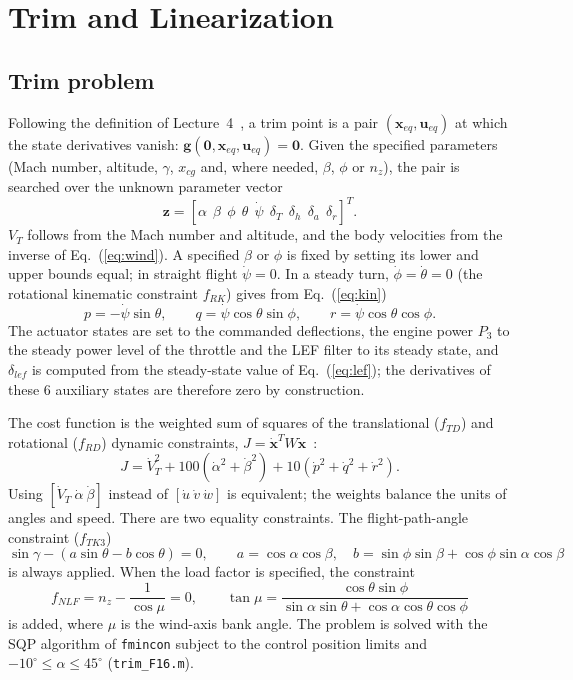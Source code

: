 \documentclass[conf]{new-aiaa}
\begin{document}
\section{Trim and Linearization}

\subsection{Trim problem}
Following the definition of Lecture~4~\cite{lec4}, a trim point is a pair $(\mathbf x_{eq},\mathbf u_{eq})$ at which the state derivatives vanish: $\mathbf g(\mathbf 0,\mathbf x_{eq},\mathbf u_{eq})=\mathbf 0$. Given the specified parameters (Mach number, altitude, $\gamma$, $x_{cg}$ and, where needed, $\beta$, $\phi$ or $n_z$), the pair is searched over the unknown parameter vector
\begin{equation}
\mathbf z=[\alpha\ \ \beta\ \ \phi\ \ \theta\ \ \dot\psi\ \ \delta_T\ \ \delta_h\ \ \delta_a\ \ \delta_r]^T.
\end{equation}
$V_T$ follows from the Mach number and altitude, and the body velocities from the inverse of Eq.~(\ref{eq:wind}). A specified $\beta$ or $\phi$ is fixed by setting its lower and upper bounds equal; in straight flight $\dot\psi=0$. In a steady turn, $\dot\phi=\dot\theta=0$ (the rotational kinematic constraint $f_{RK}$) gives from Eq.~(\ref{eq:kin})
\begin{equation}
p=-\dot\psi\sin\theta,\qquad q=\dot\psi\cos\theta\sin\phi,\qquad r=\dot\psi\cos\theta\cos\phi.
\end{equation}
The actuator states are set to the commanded deflections, the engine power $P_3$ to the steady power level of the throttle and the LEF filter to its steady state, and $\delta_{lef}$ is computed from the steady-state value of Eq.~(\ref{eq:lef}); the derivatives of these 6 auxiliary states are therefore zero by construction.

The cost function is the weighted sum of squares of the translational ($f_{TD}$) and rotational ($f_{RD}$) dynamic constraints, $J=\dot{\mathbf x}^TW\dot{\mathbf x}$~\cite{lec4,slj}:
\begin{equation}
J=\dot V_T^2+100(\dot\alpha^2+\dot\beta^2)+10(\dot p^2+\dot q^2+\dot r^2).
\end{equation}
Using $[\dot V_T\ \dot\alpha\ \dot\beta]$ instead of $[\dot u\ \dot v\ \dot w]$ is equivalent; the weights balance the units of angles and speed. There are two equality constraints. The flight-path-angle constraint ($f_{TK3}$)
\begin{equation}
\sin\gamma-(a\sin\theta-b\cos\theta)=0,\qquad a=\cos\alpha\cos\beta,\quad b=\sin\phi\sin\beta+\cos\phi\sin\alpha\cos\beta
\end{equation}
is always applied. When the load factor is specified, the constraint
\begin{equation}
f_{NLF}=n_z-\frac{1}{\cos\mu}=0,\qquad \tan\mu=\frac{\cos\theta\sin\phi}{\sin\alpha\sin\theta+\cos\alpha\cos\theta\cos\phi}
\end{equation}
is added, where $\mu$ is the wind-axis bank angle. The problem is solved with the SQP algorithm of \texttt{fmincon} subject to the control position limits and $-10^\circ\le\alpha\le45^\circ$ (\texttt{trim\_F16.m}).
\end{document}
